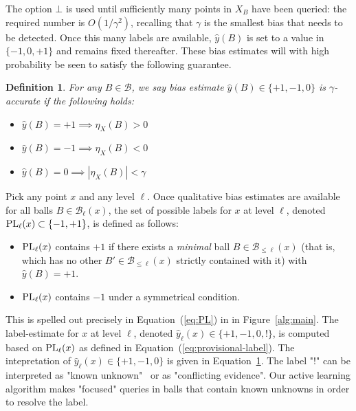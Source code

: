 \documentclass{article}
\def\B{{\mathcal B}}
\def\yh{{\widehat{y}}}
\def\PL{{\mbox{\rm PL}}}
\newtheorem{defn}[thm]{Definition}
\begin{document}
The option $\bot$ is used until sufficiently many points in $X_B$ have been queried: the required number is $O(1/\gamma^2)$, recalling that $\gamma$ is the smallest bias that needs to be detected. Once this many labels are available, $\yh(B)$ is set to a value in $\{-1,0,+1\}$ and remains fixed thereafter. These bias estimates will with high probability be seen to satisfy the following guarantee.
\begin{defn}
For any $B \in \B$, we say bias estimate $\yh(B) \in \{+1,-1,0\}$ is \emph{$\gamma$-accurate} if the following holds:
\begin{itemize}
\item $\yh(B) = +1 \implies \eta_X(B) > 0$
\item $\yh(B) = -1 \implies \eta_X(B) < 0$
\item $\yh(B) = 0 \implies |\eta_X(B)| < \gamma$
\end{itemize}
\label{def:accurate-bias-estimate}
\end{defn}

Pick any point $x$ and any level $\ell$. Once qualitative bias estimates are available for all balls $B \in \B_\ell(x)$, the set of possible labels for $x$ at level $\ell$, denoted $\PL_\ell(x) \subset \{-1,+1\}$, is defined as follows:
\begin{itemize}
\item $\PL_\ell(x)$ contains $+1$ if there exists a \emph{minimal} ball $B \in \B_{\leq \ell}(x)$ (that is, which has no other $B' \in \B_{\leq \ell}(x)$ strictly contained with it) with $\yh(B) = +1$.
\item $\PL_\ell(x)$ contains $-1$ under a symmetrical condition.
\end{itemize}
This is spelled out precisely in Equation~(\ref{eq:PL}) in  in Figure~\ref{alg:main}. The label-estimate for $x$ at level $\ell$, denoted $\yh_\ell(x) \in \{+1,-1,0,!\}$, is computed based on $\PL_\ell(x)$ as defined in Equation~(\ref{eq:provisional-label}). The intepretation of $\yh_\ell(x) \in \{+1,-1,0\}$ is given in Equation~\ref{def:accurate-bias-estimate}. The label "!" can be interpreted as "known unknown"~\cite{Rumsfled}
or as "conflicting evidence". Our active learning algorithm makes "focused" queries in balls that contain known unknowns in order to resolve the label.

\end{document}
